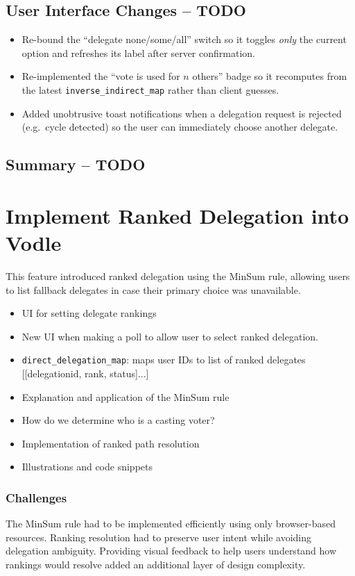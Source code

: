 \subsection{User Interface Changes -- TODO}
\begin{itemize}
  \item Re-bound the ``delegate none/some/all'' switch so it toggles \emph{only} the current option and refreshes its label after server confirmation.
  \item Re-implemented the ``vote is used for \(n\) others'' badge so it recomputes from the latest \texttt{inverse\_indirect\_map} rather than client guesses.
  \item Added unobtrusive toast notifications when a delegation request is rejected (e.g.\ cycle detected) so the user can immediately choose another delegate.
\end{itemize}

\subsection{Summary -- TODO}


\section{Implement Ranked Delegation into Vodle}
This feature introduced ranked delegation using the MinSum rule, allowing users to list fallback delegates in case their primary choice was unavailable.

\begin{itemize}
  \item UI for setting delegate rankings
  \item New UI when making a poll to allow user to select ranked delegation.
  \item \verb|direct_delegation_map|: maps user IDs to list of ranked delegates [[delegationid, rank, status]...]
  \item Explanation and application of the MinSum rule
  \item How do we determine who is a casting voter?
  \item Implementation of ranked path resolution
  \item Illustrations and code snippets
\end{itemize}

\subsubsection{Challenges}
The MinSum rule had to be implemented efficiently using only browser-based resources. Ranking resolution had to preserve user intent while avoiding delegation ambiguity. Providing visual feedback to help users understand how rankings would resolve added an additional layer of design complexity.

